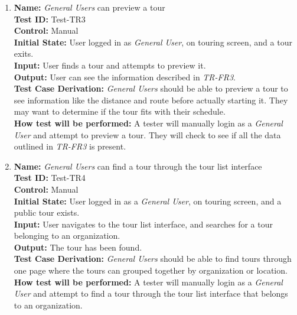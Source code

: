\documentclass[12pt, titlepage]{article}
\begin{document}
\begin{enumerate}
  \item
        \textbf{Name:} \textit{General Users} can preview a tour \label{itm:Test-TR3} \\
        \textbf{Test ID:} Test-TR3 \\
        \textbf{Control:} Manual \\
        \textbf{Initial State:} User logged in as \textit{General User}, on touring screen, and a tour exits. \\
        \textbf{Input:} User finds a tour and attempts to preview it. \\
        \textbf{Output:} User can see the information described in \textit{TR-FR3}. \\
        \textbf{Test Case Derivation:} \textit{General Users} should be able to preview a tour to see information like the distance and route before actually starting it. They may want to determine if the tour fits with their schedule. \\
        \textbf{How test will be performed:} A tester will manually login as a \textit{General User} and attempt to preview a tour. They will check to see if all the data outlined in \textit{TR-FR3} is present.

  \item
        \textbf{Name:} \textit{General Users} can find a tour through the tour list interface \label{itm:Test-TR4} \\
        \textbf{Test ID:} Test-TR4 \\
        \textbf{Control:} Manual \\
        \textbf{Initial State:} User logged in as a \textit{General User}, on touring screen, and a public tour exists. \\
        \textbf{Input:} User navigates to the tour list interface, and searches for a tour belonging to an organization. \\
        \textbf{Output:} The tour has been found. \\
        \textbf{Test Case Derivation:} \textit{General Users} should be able to find tours through one page where the tours can grouped together by organization or location. \\
        \textbf{How test will be performed:} A tester will manually login as a \textit{General User} and attempt to find a tour through the tour list interface that belongs to an organization.


\end{enumerate}
\end{document}
